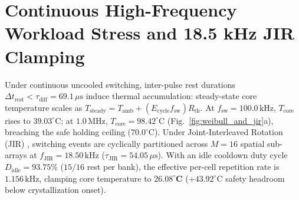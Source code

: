 \documentclass[letterpaper,10pt]{article}
\begin{document}
\section{Continuous High-Frequency Workload Stress and 18.5 kHz JIR Clamping}
Under continuous uncooled switching, inter-pulse rest durations $\Delta t_{\text{rest}} < \tau_{\text{diff}} = 69.1\,\mu\text{s}$ induce thermal accumulation: steady-state core temperature scales as $T_{\text{steady}} = T_{\text{amb}} + (E_{\text{cycle}} f_{\text{sw}}) R_{\text{th}}$. At $f_{\text{sw}} = 100.0\,\text{kHz}$, $T_{\text{core}}$ rises to $39.03^\circ\text{C}$; at $1.0\,\text{MHz}$, $T_{\text{core}} = 98.42^\circ\text{C}$ (Fig.~\ref{fig:weibull_and_jir}a), breaching the safe holding ceiling ($70.0^\circ\text{C}$). Under Joint-Interleaved Rotation (JIR) \cite{Tuckerman1981}, switching events are cyclically partitioned across $M = 16$ spatial sub-arrays at $f_{\text{JIR}} = 18.50\,\text{kHz}$ ($\tau_{\text{JIR}} = 54.05\,\mu\text{s}$). With an idle cooldown duty cycle $D_{\text{idle}} = 93.75\%$ ($15/16$ rest per bank), the effective per-cell repetition rate is $1.156\,\text{kHz}$, clamping core temperature to $\mathbf{26.08^\circ\text{C}}$ ($+43.92^\circ\text{C}$ safety headroom below crystallization onset).
\end{document}
